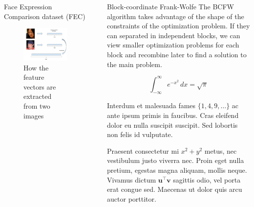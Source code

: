 \documentclass[final]{beamer}
\newlength{\sepwidth}
\newlength{\colwidth}
\newcommand{\separatorcolumn}{\begin{column}{\sepwidth}\end{column}}
\begin{document}
\begin{frame}[t]
\begin{columns}[t]
\begin{column}{\colwidth}
\begin{alertblock}{Face Expression Comparison dataset (FEC)}
    \begin{figure}
      \includegraphics[scale=0.75]{img/fec_poster.jpg}
      \caption{How the feature vectors are extracted from two images}
      \label{feat_vec}
    \end{figure}
  \end{alertblock}

\end{column}

\separatorcolumn

\begin{column}{\colwidth}

  \begin{block}{Block-coordinate Frank-Wolfe}
    The BCFW algorithm takes advantage of the shape of the constraints of the
optimization problem. If they can separated in independent blocks, we can view
smaller optimization problems for each block and recombine later to find a
solution to the main problem.

    $$
    \int_{-\infty}^{\infty} e^{-x^2}\,dx = \sqrt{\pi}
    $$

    Interdum et malesuada fames $\{1, 4, 9, \ldots\}$ ac ante ipsum primis in
    faucibus. Cras eleifend dolor eu nulla suscipit suscipit. Sed lobortis non
    felis id vulputate.


    Praesent consectetur mi $x^2 + y^2$ metus, nec vestibulum justo viverra
    nec. Proin eget nulla pretium, egestas magna aliquam, mollis neque. Vivamus
    dictum $\mathbf{u}^\intercal\mathbf{v}$ sagittis odio, vel porta erat
    congue sed. Maecenas ut dolor quis arcu auctor porttitor.


\end{block}
\end{column}
\end{columns}
\end{frame}
\end{document}
